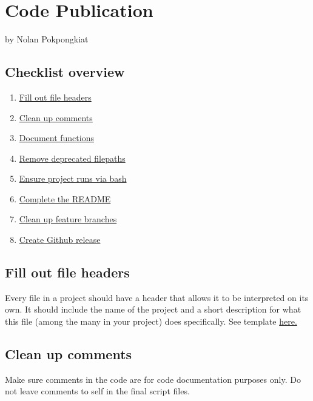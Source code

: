 \documentclass[
]{book}
\providecommand{\tightlist}{%
  \setlength{\itemsep}{0pt}\setlength{\parskip}{0pt}}
\begin{document}
\chapter{Code Publication}\label{code-publication}

by Nolan Pokpongkiat

\section{Checklist overview}\label{checklist-overview}

\begin{enumerate}
\def\labelenumi{\arabic{enumi}.}
\tightlist
\item
  \hyperref[fill-out-file-headers]{Fill out file headers}
\item
  \hyperref[clean-up-comments]{Clean up comments}
\item
  \hyperref[document-functions]{Document functions}
\item
  \hyperref[remove-deprecated-filepaths]{Remove deprecated filepaths}
\item
  \hyperref[ensure-project-runs-via-bash]{Ensure project runs via bash}
\item
  \hyperref[complete-the-readme]{Complete the README}
\item
  \hyperref[clean-up-feature-branches]{Clean up feature branches}
\item
  \hyperref[create-github-release]{Create Github release}
\end{enumerate}

\section{Fill out file headers}\label{fill-out-file-headers}

Every file in a project should have a header that allows it to be interpreted on its own. It should include the name of the project and a short description for what this file (among the many in your project) does specifically. See template \href{https://jadebc.github.io/lab-manual/coding-practices.html\#file-headers}{here.}

\section{Clean up comments}\label{clean-up-comments}

Make sure comments in the code are for code documentation purposes only. Do not leave comments to self in the final script files.
\end{document}
